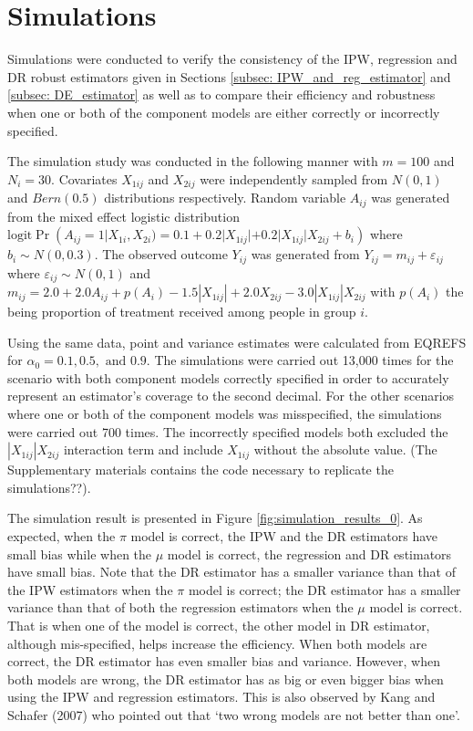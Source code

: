 \documentclass[oupdraft]{biostatistics}
\begin{document}
\section{Simulations}\label{sec: DR_simulation}

Simulations were conducted to verify the consistency of the IPW, regression and DR robust estimators given in Sections \ref{subsec: IPW_and_reg_estimator} and \ref{subsec: DE_estimator} as well as to compare their efficiency and robustness when one or both of the component models are either correctly or incorrectly specified. 

The simulation study was conducted in the following manner with $m = 100$ and $N_i = 30$. Covariates $X_{1ij}$ and $X_{2ij}$ were independently sampled from $N(0, 1)$ and $Bern(0.5)$ distributions respectively. Random variable $A_{ij}$ was generated from the mixed effect logistic distribution $\mbox{logit}\Pr(A_{ij}=1|X_{1i}, X_{2i}) = 0.1 + 0.2 |X_{1ij}| + 0.2 |X_{1ij}| X_{2ij} + b_i)$ where $b_{i} \sim N(0, 0.3)$. The observed outcome $Y_{ij}$ was generated from $Y_{ij}=m_{ij}+\varepsilon_{ij}$ where $\varepsilon_{ij} \sim N(0,1)$ and $m_{ij} = 2.0 + 2.0 A_{ij} + p(A_i) - 1.5 |X_{1ij}| + 2.0 X_{2ij} -3.0 |X_{1ij}| X_{2ij}$ with $p(A_i)$ the being proportion of treatment received among people in group $i$. 

Using the same data, point and variance estimates were calculated from EQREFS for $\alpha_0 = 0.1, 0.5, \text{ and } 0.9$. The simulations were carried out 13,000 times for the scenario with both component models correctly specified in order to accurately represent an estimator's coverage to the second decimal. For the other scenarios where one or both of the component models was misspecified, the simulations were carried out 700 times. The incorrectly specified models both excluded the $|X_{1ij}| X_{2ij}$ interaction term and include $X_{1ij}$ without the absolute value. (The Supplementary materials contains the code necessary to replicate the simulations??).

The simulation result is presented in Figure \ref{fig:simulation_results_0}. As expected, when the $\pi$ model is correct, the IPW and the DR estimators have small bias while when the $\mu$ model is correct, the regression and DR estimators have small bias. Note that the DR estimator has a smaller variance than that of the IPW estimators when the $\pi$ model is correct; the DR estimator has a smaller variance than that of both the regression estimators when the $\mu$ model is correct. That is when one of the model is correct, the other model in DR estimator, although mis-specified, helps increase the efficiency. When both models are correct, the DR estimator has even smaller bias and variance. However, when both models are wrong, the DR estimator has as big or even bigger bias when using the IPW and regression estimators. This is also observed by Kang and Schafer (2007)\nocite{kang2007demystifying} who pointed out that `two wrong models are not better than one'.
\end{document}
